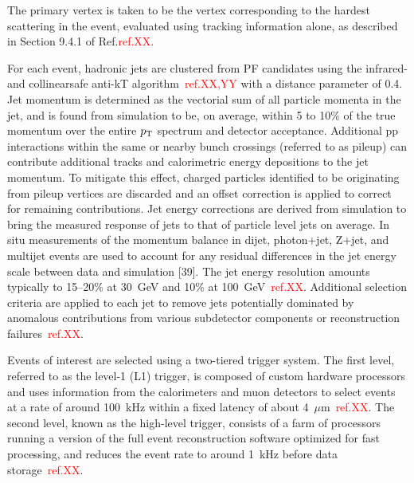 \documentclass{cernatlasnote}
\newcommand{\mic}{$\mu$m\xspace}
\newcommand{\pt}{$p_{\text T}$\xspace}
\begin{document}
The primary vertex is taken to be the vertex corresponding to the hardest scattering in the event, evaluated using tracking information alone, as described in Section 9.4.1 of Ref.\textcolor{red}{ref.XX}.

For each event, hadronic jets are clustered from PF candidates using the infrared- and collinearsafe anti-kT algorithm~\textcolor{red}{ref.XX,YY} with a distance parameter of 0.4. Jet momentum is determined as the vectorial sum of all particle momenta in the jet, and is found from simulation to be, on average, within 5 to 10\% of the true momentum over the entire \pt spectrum and detector acceptance. Additional pp interactions within the same or nearby bunch crossings (referred to as pileup) can contribute additional tracks and calorimetric energy depositions to the jet momentum. To mitigate this effect, charged particles identified to be originating from pileup vertices are discarded and an offset correction is applied to correct for remaining contributions. Jet energy corrections are derived from simulation to bring the measured response of jets to that of particle level jets on average. In situ measurements of the momentum balance in dijet, photon+jet, Z+jet, and multijet events are used to account for any residual differences in the jet energy scale between data and simulation [39]. The jet energy resolution amounts typically to 15–20\% at 30~GeV and 10\% at 100~GeV~\textcolor{red}{ref.XX}. Additional selection criteria are applied to each jet to remove jets potentially dominated by anomalous contributions from various subdetector components or reconstruction failures~\textcolor{red}{ref.XX}.

Events of interest are selected using a two-tiered trigger system. The first level, referred to as the level-1 (L1) trigger, is composed of custom hardware processors and uses information from the calorimeters and muon detectors to select events at a rate of around 100~kHz within a fixed latency of about 4~\mic~\textcolor{red}{ref.XX}. The second level, known as the high-level trigger, consists of a farm of processors running a version of the full event reconstruction software optimized for fast processing, and reduces the event rate to around 1~kHz before data storage~\textcolor{red}{ref.XX}.


\end{document}
